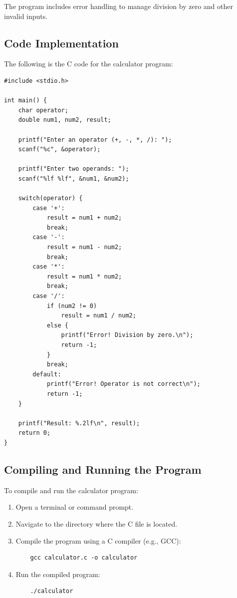 \documentclass{article}
\begin{document}
The program includes error handling to manage division by zero and other invalid inputs.

\subsection{Code Implementation}
The following is the C code for the calculator program:

\begin{verbatim}
#include <stdio.h>

int main() {
    char operator;
    double num1, num2, result;

    printf("Enter an operator (+, -, *, /): ");
    scanf("%c", &operator);

    printf("Enter two operands: ");
    scanf("%lf %lf", &num1, &num2);

    switch(operator) {
        case '+':
            result = num1 + num2;
            break;
        case '-':
            result = num1 - num2;
            break;
        case '*':
            result = num1 * num2;
            break;
        case '/':
            if (num2 != 0)
                result = num1 / num2;
            else {
                printf("Error! Division by zero.\n");
                return -1;
            }
            break;
        default:
            printf("Error! Operator is not correct\n");
            return -1;
    }

    printf("Result: %.2lf\n", result);
    return 0;
}
\end{verbatim}


\subsection{Compiling and Running the Program}
To compile and run the calculator program:
\begin{enumerate}
    \item Open a terminal or command prompt.
    \item Navigate to the directory where the C file is located.
    \item Compile the program using a C compiler (e.g., GCC):
    \begin{verbatim}
    gcc calculator.c -o calculator
    \end{verbatim}
    \item Run the compiled program:
    \begin{verbatim}
    ./calculator
    \end{verbatim}
\end{enumerate}
\end{document}
